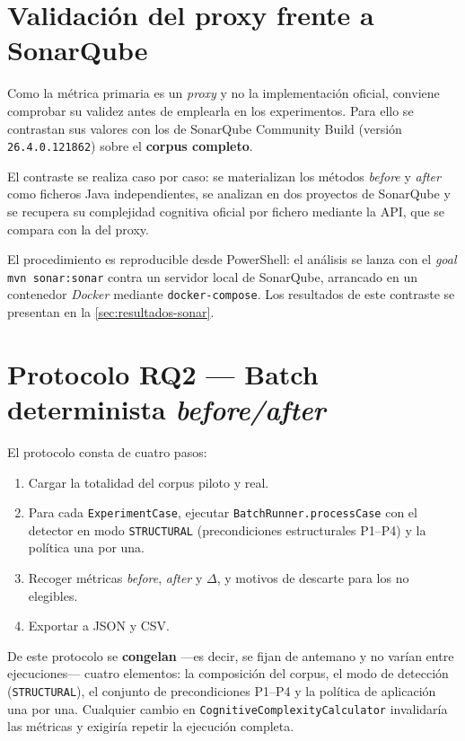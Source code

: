 \section{Validación del proxy frente a SonarQube}
\label{sec:sonar-val}
Como la métrica primaria es un \emph{proxy} y no la implementación oficial,
conviene comprobar su validez antes de emplearla en los experimentos. Para ello
se contrastan sus valores con los de SonarQube Community Build (versión
\texttt{26.4.0.121862}) sobre el \textbf{corpus completo}.

El contraste se realiza caso por caso: se materializan los métodos \emph{before}
y \emph{after} como ficheros Java independientes, se analizan en dos proyectos
de SonarQube y se recupera su complejidad cognitiva oficial por fichero mediante
la API, que se compara con la del proxy.

El procedimiento es reproducible desde PowerShell: el análisis se lanza con el
\emph{goal} \texttt{mvn sonar:sonar} contra un servidor local de SonarQube,
arrancado en un contenedor \emph{Docker} mediante \texttt{docker-compose}. Los
resultados de este contraste se presentan en la \autoref{sec:resultados-sonar}.

\section{Protocolo RQ2 — Batch determinista \emph{before/after}}
\label{sec:exp-rq2}
El protocolo consta de cuatro pasos:

\begin{enumerate}
    \item Cargar la totalidad del corpus piloto y real.
    \item Para cada \texttt{ExperimentCase}, ejecutar
    \lstinline|BatchRunner.processCase| con el detector en modo
    \texttt{STRUCTURAL} (precondiciones estructurales P1--P4) y la política
    una por una.
    \item Recoger métricas \emph{before}, \emph{after} y $\Delta$, y motivos de
    descarte para los no elegibles.
    \item Exportar a JSON y CSV.
\end{enumerate}

De este protocolo se \textbf{congelan} ---es decir, se fijan de antemano y no
varían entre ejecuciones--- cuatro elementos: la composición del corpus, el modo
de detección (\texttt{STRUCTURAL}), el conjunto de precondiciones P1--P4 y la
política de aplicación una por una. Cualquier cambio en
\texttt{Cognitive\allowbreak Complexity\allowbreak Calculator} invalidaría las métricas y exigiría
repetir la ejecución completa.


